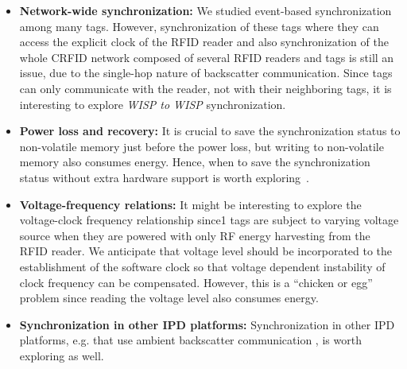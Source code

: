 \documentclass[10pt,journal,compsoc]{IEEEtran}
\begin{document}
\begin{itemize}
	\item \textbf{Network-wide synchronization:} We studied event-based synchronization among many tags. However, synchronization of these tags where they can access the explicit clock of the RFID reader and also synchronization of the whole CRFID network composed of several RFID readers and tags is still an issue, due to the single-hop nature of backscatter communication. Since tags can only communicate with the reader, not with their neighboring tags, it is interesting to explore \emph{WISP to WISP} synchronization. 
	
	\item \textbf{Power loss and recovery:} It is crucial to save the synchronization status to non-volatile memory just before the power loss, but writing to non-volatile memory also consumes energy. Hence, when to save the synchronization status without extra hardware support is worth exploring~\cite{Buettner:2011:Dewdrop,Ransford:2011:Mementos,Lucia:2015:Execution,Colin:2016:Debugger}.
	
	\item \textbf{Voltage-frequency relations:} It might be interesting to explore the voltage-clock frequency relationship since1 tags are subject to varying voltage source when they are powered with only RF energy harvesting from the RFID reader. We anticipate that voltage level should be incorporated to the establishment of the software clock so that voltage dependent instability of clock frequency can be compensated. However, this is a ``chicken or egg'' problem since reading the voltage level also consumes energy. 
	
	\item \textbf{Synchronization in other IPD platforms:} Synchronization in other IPD platforms, e.g. that use ambient backscatter communication \cite{ambient_backscatter}, is worth exploring as well. 
\end{itemize}

\ifCLASSOPTIONcaptionsoff
  \newpage
\fi






% 
\end{document}
